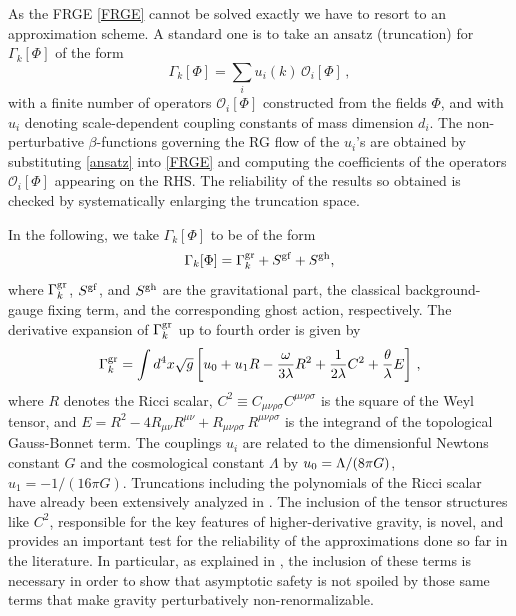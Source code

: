 \documentclass[11pt,reqno]{article}
\newcommand{\be}{\begin{equation}}
\newcommand{\ee}{\end{equation}}
\newcommand{\cO}{\mathcal{O}}
\newcommand{\2}{\sqrt{2\,}}
\begin{document}
As the FRGE \eqref{FRGE} cannot be solved exactly we have to resort to an approximation scheme.
A standard one is to take an ansatz (truncation) for $\Gamma_k[\Phi]$ of the form
%
\be\label{ansatz}
\Gamma_k[\Phi] = \sum_i u_{i}(k) \, \cO_i[\Phi]\,,
\ee
%
with a finite number of operators $\cO_i[\Phi]$ constructed from the fields $\Phi$, and with $u_i$ denoting scale-dependent coupling constants of mass dimension $d_i$. The  non-perturbative $\beta$-functions governing the RG flow of the $u_i$'s are obtained by substituting \eqref{ansatz} into \eqref{FRGE} and computing the coefficients of the operators $\cO_i[\Phi]$ appearing on the RHS. The reliability of the results so obtained is checked by systematically enlarging the truncation space.

In the following, we take $\Gamma_k[\Phi]$ to be of the form
%
\be\label{EAA}
\Gamma_k[\Phi] = \Gamma_k^{\rm gr} + S^{\rm gf} + S^{\rm gh} ,
\ee
%
where $\Gamma_k^{\rm gr}$, $S^{\rm gf}$, and $S^{\rm gh}$ are the gravitational part, 
the classical background-gauge fixing term, and the corresponding ghost action,  
respectively. The derivative expansion of $\Gamma_k^{\rm gr}$ up to fourth order is
given by
%
\be\label{eq:ansatz}
\Gamma_k^{\rm gr} = \int d^4x \sqrt{g} \left[ u_0 + u_1 R  - \frac{\omega}{3 \lambda} R^2 + \frac{1}{2\lambda} C^2 + \frac{\theta}{\lambda} E \right]\,,
\ee
%
where $R$ denotes the Ricci scalar, $C^2\equiv C_{\mu \nu \rho \sigma}C^{\mu \nu \rho \sigma}$ is the square of the Weyl tensor, and $E = R^2 - 4 R_{\mu \nu} R^{\mu \nu} + R_{\mu \nu \rho \sigma} \, R^{\mu \nu \rho \sigma}$ is the integrand of the topological Gauss-Bonnet term. 
The couplings $u_i$ are related to the dimensionful Newtons constant $G$ and the cosmological constant $\Lambda$ by
$u_0 = \Lambda/(8 \pi G)$, $u_1 = - 1/(16 \pi G)$.
%
Truncations including the polynomials of the Ricci scalar have already 
been extensively analyzed in \cite{OliverR2,CPR:2008,MS:2008,CPR2:2008}. The inclusion of the tensor structures like $C^2$, 
responsible for the key features of higher-derivative gravity, is novel,
and provides an important test for the reliability of the approximations done so far in the literature. 
In particular, as explained in \cite{Benedetti:2009gn}, the inclusion of these terms is necessary in order to show that asymptotic safety is not spoiled by those same terms that make gravity perturbatively non-renormalizable.
\end{document}
